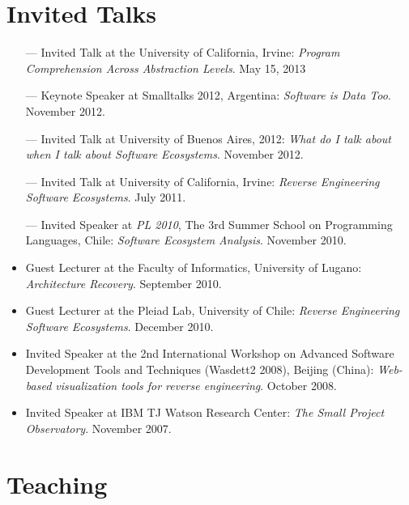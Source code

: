 \documentclass[a4paper]{article}
\begin{document}
\section{Invited Talks}

\begin{itemize}
\item [---] Invited Talk at the University of California, Irvine: {\em Program Comprehension Across Abstraction Levels}. May 15, 2013
\item [---] Keynote Speaker at Smalltalks 2012, Argentina: {\em Software is Data Too}. November 2012.
\item [---] Invited Talk at University of Buenos Aires, 2012: {\em What do I talk about when I talk about Software Ecosystems}. November 2012.
\item [---] Invited Talk at University of California, Irvine: {\em Reverse Engineering Software Ecosystems}. July 2011.
\item [---] Invited Speaker at {\em PL 2010}, The 3rd Summer School on Programming Languages, Chile: {\em Software Ecosystem Analysis}. November 2010.
\item Guest Lecturer at the Faculty of Informatics, University of Lugano: {\em Architecture Recovery}. September 2010.
\item Guest Lecturer at the Pleiad Lab, University of Chile: {\em Reverse Engineering Software Ecosystems}. December 2010. 
\item Invited Speaker at the 2nd International Workshop on Advanced Software Development Tools and Techniques (Wasdett2 2008), Beijing (China): {\em Web-based visualization tools for reverse engineering}. October 2008.
\item Invited Speaker at IBM TJ Watson Research Center: {\em The Small Project Observatory}. November 2007.
\end{itemize}


\section{Teaching}
\end{document}
